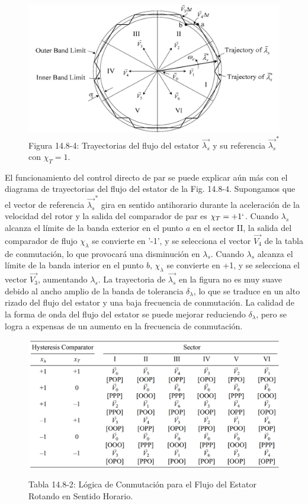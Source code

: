 \documentclass[letterpaper,12pt]{article}
\begin{document}
\begin{figure}[ht]
\centering
\includegraphics{graficos/img26.jpg}
\caption{Figura 14.8-4: Trayectorias del flujo del estator $\vec{\lambda_s}$ y su referencia $\vec{\lambda_s}^*$ con $\chi_T = 1$.}
\label{fig:14.8-4}
\end{figure}
\FloatBarrier

\clearpage
El funcionamiento del control directo de par se puede explicar aún más con el diagrama de trayectorias del flujo del estator de la Fig. 14.8-4. Supongamos que el vector de referencia $\vec{\lambda_s}^*$ gira en sentido antihorario durante la aceleración de la velocidad del rotor y la salida del comparador de par es $\chi_T = +1`$. Cuando $\lambda_s$ alcanza el límite de la banda exterior en el punto $a$ en el sector II, la salida del comparador de flujo $\chi_\lambda$ se convierte en '-1', y se selecciona el vector $\vec{V_4}$ de la tabla de conmutación, lo que provocará una disminución en $\lambda_s$. Cuando $\lambda_s$ alcanza el límite de la banda interior en el punto $b$, $\chi_\lambda$ se convierte en +1, y se selecciona el vector $\vec{V_3}$, aumentando $\lambda_s$. La trayectoria de $\vec{\lambda_s}$ en la figura no es muy suave debido al ancho amplio de la banda de tolerancia $\delta_\lambda$, lo que se traduce en un alto rizado del flujo del estator y una baja frecuencia de conmutación. La calidad de la forma de onda del flujo del estator se puede mejorar reduciendo $\delta_\lambda$, pero se logra a expensas de un aumento en la frecuencia de conmutación.

\begin{figure}[ht]
\centering
\caption{Tabla 14.8-2: Lógica de Conmutación para el Flujo del Estator Rotando en Sentido Horario.}
\includegraphics[scale=0.4]{graficos/tabla_14_8_2.png}
\label{tab:14.8-2}
\end{figure}
\FloatBarrier
\end{document}
